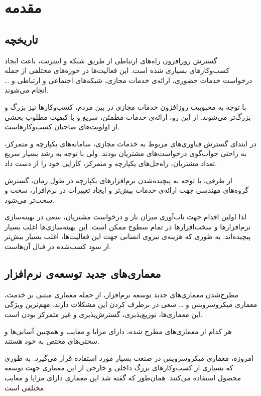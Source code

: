 \section{مقدمه}\label{sec:intro}

\subsection{تاریخچه}\label{subsec:intro_history}

گسترش روز‌افزون راه‌های ارتباطی از طریق شبکه و اینترنت، باعث ایجاد کسب‌وکار‌های بسیاری شده است. این فعالیت‌ها در حوزه‌های مختلفی از جمله درخواست خدمات حضوری، ارائه‌ی خدمات مجازی، شبکه‌های اجتماعی و ارتباطی و … انجام می‌شوند.

با توجه به محبوبیت روز‌افزون خدمات مجازی در بین مردم، کسب‌و‌کار‌ها نیز بزرگ و بزرگ‌تر می‌شوند. از این رو، ارائه‌ی خدمات مطمئن، سریع و با کیفیت مطلوب بخشی از اولویت‌های صاحبان کسب‌و‌کارهاست.

در ابتدای گسترش فناوری‌های مربوط به خدمات مجازی، سامانه‌های یکپارچه و متمرکز، به راحتی جواب‌گوی درخواست‌های مشتریان بودند. ولی با توجه به رشد بسیار سریع تعداد مشتریان، راه‌حل‌های یکپارچه و متمرکز، کارایی خود را از دست داد.

از طرفی، با توجه به پیچیده‌شدن نرم‌افزار‌های یکپارچه در طول زمان، گسترش گروه‌های مهندسی جهت ارائه‌ی خدمات بیش‌تر و ایجاد تغییرات در نرم‌افزار، سخت و سخت‌تر می‌شود.

لذا اولین اقدام جهت تاب‌آوری میزان بار و درخواست مشتریان، سعی در بهینه‌سازی نرم‌افزار‌ها و سخت‌افزار‌ها در تمام سطوح ممکن است. این بهینه‌سازی‌ها اغلب بسیار پیچیده‌اند. به طوری که هزینه‌ی نیروی انسانی جهت این فعالیت‌ها، اغلب بسیار بیش‌تر‌ از سود کسب‌شده در قبال آن‌هاست.

\subsection{معماری‌های جدید توسعه‌ی نرم‌افزار}\label{subsec:intro_newarcs}

مطرح‌شدن معماری‌های جدید توسعه نرم‌افزار، از جمله معماری مبتنی بر خدمت، معماری میکروسرویس و … سعی در برطرف کردن این مشکلات دارند. مهم‌ترین ویژگی این معماری‌ها،‌ توزیع‌پذیری، گسترش‌پذیری و غیر متمرکز بودن است.

هر کدام از معماری‌های مطرح شده، دارای مزایا و معایب و همچنین آسانی‌ها و سختی‌های مختص به خود هستند.

امروزه، معماری میکروسرویس در صنعت بسیار مورد استفاده قرار می‌گیرد. به طوری که بسیاری‌ از کسب‌و‌کار‌های بزرگ داخلی و خارجی از این معماری جهت توسعه محصول استفاده می‌کنند. همان‌طور که گفته شد این معماری دارای مزایا و معایب مختلفی است.

